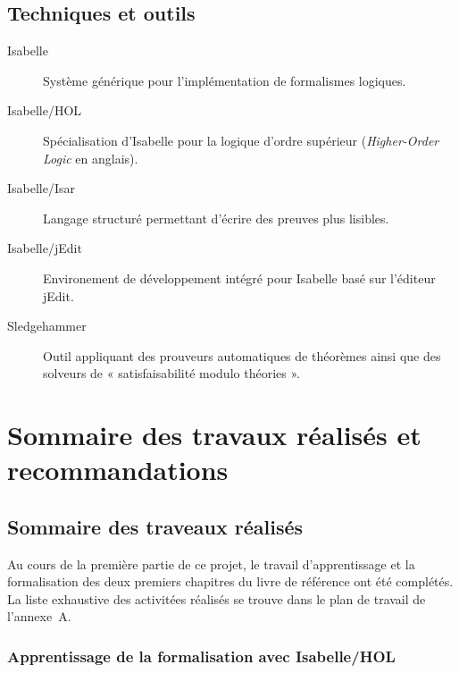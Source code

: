 \documentclass[a4paper, oneside, 12pt, titlepage]{article}
\begin{document}
\subsection{Techniques et outils}

\begin{description}
  \item[Isabelle] Système générique pour l'implémentation de formalismes logiques.
  \item[Isabelle/HOL] Spécialisation d'Isabelle pour la logique d'ordre supérieur
    (\emph{Higher-Order Logic} en anglais).
  \item[Isabelle/Isar] Langage structuré permettant d'écrire des preuves plus lisibles.
  \item[Isabelle/jEdit] Environement de développement intégré pour Isabelle basé sur l'éditeur
    jEdit.
  \item[Sledgehammer] Outil appliquant des prouveurs automatiques de théorèmes ainsi que des
    solveurs de « satisfaisabilité modulo théories ».
\end{description}

\section{Sommaire des travaux réalisés et recommandations}

\subsection{Sommaire des traveaux réalisés}



Au cours de la première partie de ce projet, le travail d'apprentissage et la formalisation des deux
premiers chapitres du livre de référence ont été complétés. La liste exhaustive des activitées
réalisés se trouve dans le plan de travail de l'annexe~A.

\subsubsection{Apprentissage de la formalisation avec Isabelle/HOL}
\end{document}
